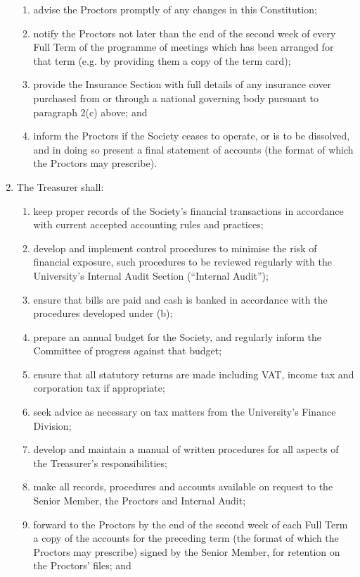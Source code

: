 \documentclass[11pt]{article}
\begin{document}
\begin{enumerate}
\begin{enumerate}
\item advise the Proctors promptly of any changes in this Constitution;
\item notify the Proctors not later than the end of the second week of every Full Term of the programme of meetings which has been arranged for that term (e.g. by providing them a copy of the term card); 
\item provide the Insurance Section with full details of any insurance cover purchased from or through a national governing body pursuant to paragraph 2(c) above; and
\item inform the Proctors if the Society ceases to operate, or is to be dissolved, and in doing so present a final statement of accounts (the format of which the Proctors may prescribe).
\end{enumerate}
\item The Treasurer shall:
\begin{enumerate}
\item keep proper records of the Society's financial transactions in accordance with current accepted accounting rules and practices;
\item develop and implement control procedures to minimise the risk of financial exposure, such procedures to be reviewed regularly with the University's Internal Audit Section (``Internal Audit'');
\item ensure that bills are paid and cash is banked in accordance with the procedures developed under (b);
\item prepare an annual budget for the Society, and regularly inform the Committee of progress against that budget;
\item ensure that all statutory returns are made including VAT, income tax and corporation tax if appropriate;
\item seek advice as necessary on tax matters from the University's Finance Division;
\item develop and maintain a manual of written procedures for all aspects of the Treasurer's responsibilities;
\item make all records, procedures and accounts available on request to the Senior Member, the Proctors and Internal Audit;
\item forward to the Proctors by the end of the second week of each Full Term a copy of the accounts for the preceding term (the format of which the Proctors may prescribe) signed by the Senior Member, for retention on the Proctors' files; and

\end{enumerate}
\end{enumerate}
\end{document}

